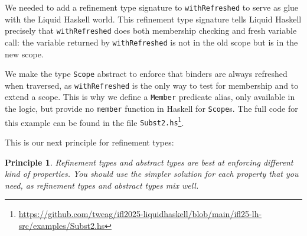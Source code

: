 \documentclass[sigconf, review]{acmart}
\newcommand{\tc}[1]{{\small\texttt{#1}}}
\newcommand{\sourcefile}[1]{\tc{#1}\footnote{\scriptsize\url{https://github.com/tweag/ifl2025-liquidhaskell/blob/main/ifl25-lh-src/examples/#1}}}
\newtheorem{principle}{Principle}
\begin{document}
We needed to add a refinement type signature to \tc{withRefreshed} to serve as
glue with the Liquid Haskell world. This refinement type signature tells Liquid
Haskell precisely that \tc{withRefreshed} does both membership checking and
fresh variable call: the variable returned by \tc{withRefreshed} is not in the
old scope but is in the new scope.

We make the type \tc{Scope} abstract to enforce that binders are always
refreshed when traversed, as \tc{withRefreshed} is the only
way to test for membership and to extend a scope. This is why we define a
\tc{Member} predicate alias, only available in the logic, but provide no
\tc{member} function in Haskell for \tc{Scope}s.
The full code for this example can be found in the
file \sourcefile{Subst2.hs}.

This is our next principle for refinement types:
\begin{principle}
  Refinement types and abstract types are best at enforcing different kind of
  properties. You should use the simpler solution for each property that you
  need, as refinement types and abstract types mix well.
\end{principle}




\end{document}
